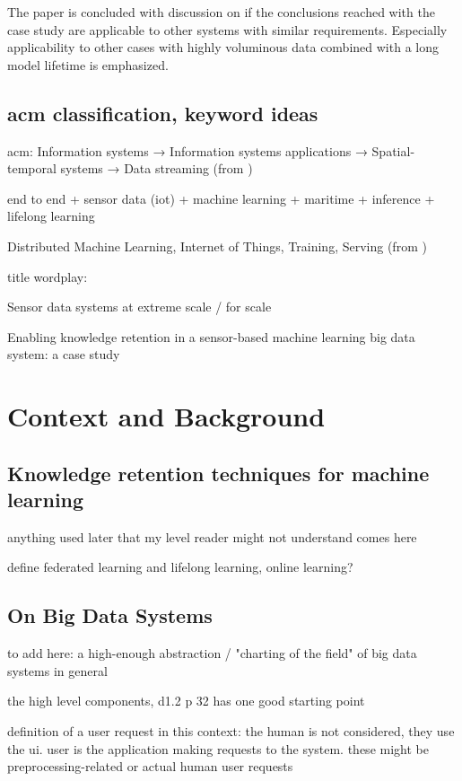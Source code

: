 The paper is concluded with discussion on if the conclusions reached with the case study are applicable to other systems with similar requirements. Especially applicability to other cases with highly voluminous data combined with a long model lifetime is emphasized.

\section{acm classification,  keyword ideas}

acm:
Information systems → Information systems applications →
Spatial-temporal systems → Data streaming (from \cite{uprctrajectorysystem})

end to end + sensor data (iot) + machine learning + maritime + inference + lifelong learning

Distributed Machine Learning, Internet of Things, Training, Serving (from \cite{mliot})

title wordplay:

Sensor data systems at extreme scale / for scale

Enabling knowledge retention in a sensor-based machine learning big data system: a case study

\chapter{Context and Background}

\section{Knowledge retention techniques for machine learning}

anything used later that my level reader might not understand comes here

define federated learning and lifelong learning, online learning?

\section{On Big Data Systems}


to add here: a high-enough abstraction / "charting of the field" of big data systems in general

the high level components, d1.2 p 32 has one good starting point

definition of a user request in this context: the human is not considered, they use the ui. user is the application making requests to the system. these might be preprocessing-related or actual human user requests

